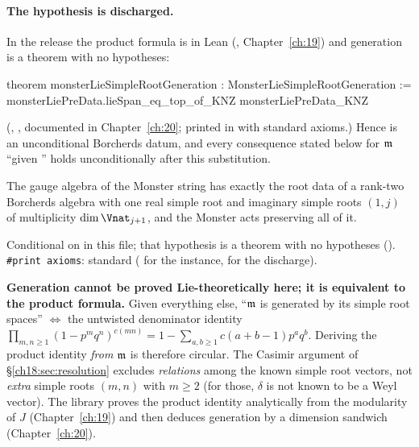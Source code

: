 \paragraph{The hypothesis is discharged.}  In the release the product formula is in Lean
(, Chapter~\ref{ch:19}) and generation is a theorem with no hypotheses:
\begin{leancode}
theorem monsterLieSimpleRootGeneration : MonsterLieSimpleRootGeneration :=
  monsterLiePreData.lieSpan_eq_top_of_KNZ monsterLiePreData_KNZ
\end{leancode}
(, ,
documented in Chapter~\ref{ch:20}; printed in  with standard axioms.)
Hence  is an unconditional Borcherds datum, and every
consequence stated below for $\mathfrak{m}$ ``given '' holds unconditionally after this substitution.
\begin{physics}
The gauge algebra of the Monster string has exactly the root data of a rank-two Borcherds algebra with one real
simple root and imaginary simple roots $(1,j)$ of multiplicity $\dim\Vnat_{j+1}$, and the Monster acts preserving all of it.
\end{physics}
\begin{status}
Conditional on  in this file; that hypothesis is a theorem with no
hypotheses ().  \texttt{\#print axioms}: standard
( for the instance,  for
the discharge).
\end{status}

\begin{warning}
\textbf{Generation cannot be proved Lie-theoretically here; it is equivalent to the product formula.}  Given everything else,
``$\mathfrak{m}$ is generated by its simple root spaces'' $\Longleftrightarrow$ the untwisted denominator identity
$\prod_{m,n\ge1}(1-p^mq^n)^{c(mn)}=1-\sum_{a,b\ge1}c(a+b-1)p^aq^b$.  Deriving the product identity \emph{from} $\mathfrak{m}$ is therefore
circular.  The Casimir argument of \S\ref{ch18:sec:resolution} excludes \emph{relations} among the known simple root
vectors, not \emph{extra} simple roots $(m,n)$ with $m\ge2$ (for those, $\delta$ is not known to be a Weyl vector).  The
library proves the product identity analytically from the modularity of $J$ (Chapter~\ref{ch:19}) and then deduces
generation by a dimension sandwich (Chapter~\ref{ch:20}).
\end{warning}

